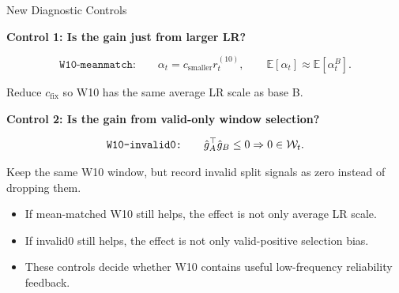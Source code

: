 \documentclass[aspectratio=169]{beamer}
\begin{document}
\begin{frame}{New Diagnostic Controls}
\small

\textbf{Control 1: Is the gain just from larger LR?}

\[
  \texttt{W10-meanmatch:}
  \qquad
  \alpha_t
  =
  c_{\mathrm{smaller}} r^{(10)}_t,
  \qquad
  \mathbb E[\alpha_t]\approx \mathbb E[\alpha^{B}_t].
\]


{\footnotesize\color{Muted}
Reduce \(c_{\mathrm{fix}}\) so W10 has the same average LR scale as base B.
}

\textbf{Control 2: Is the gain from valid-only window selection?}

\[
  \texttt{W10-invalid0:}
  \qquad
  \hat g_A^\top \hat g_B \le 0
  \Rightarrow
  0 \in {\cal W}_t .
\]

\vspace{0.4em}

{\footnotesize\color{Muted}
Keep the same W10 window, but record invalid split signals as zero instead of dropping them.
}


\begin{itemize}
  \item If mean-matched W10 still helps, the effect is not only average LR scale.
  \item If invalid0 still helps, the effect is not only valid-positive selection bias.
  \item These controls decide whether W10 contains useful low-frequency reliability feedback.
\end{itemize}

\end{frame}
\end{document}
